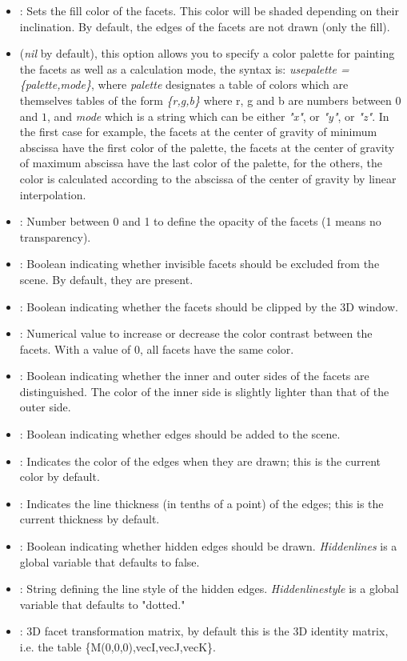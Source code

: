 \begin{itemize}
    \item {}: Sets the fill color of the facets. This color will be shaded depending on their inclination. By default, the edges of the facets are not drawn (only the fill).     \item {} (\emph{nil} by default), this option allows you to specify a color palette for painting the facets as well as a calculation mode, the syntax is: \emph{usepalette = \{palette,mode\}}, where \emph{palette} designates a table of colors which are themselves tables of the form \emph{\{r,g,b\}} where r, g and b are numbers between $0$ and $1$, and \emph{mode} which is a string which can be either \emph{"x"}, or \emph{"y"}, or \emph{"z"}. In the first case for example, the facets at the center of gravity of minimum abscissa have the first color of the palette, the facets at the center of gravity of maximum abscissa have the last color of the palette, for the others, the color is calculated according to the abscissa of the center of gravity by linear interpolation.     \item {}: Number between 0 and 1 to define the opacity of the facets (1 means no transparency).
    \item {}: Boolean indicating whether invisible facets should be excluded from the scene. By default, they are present.
    \item {}: Boolean indicating whether the facets should be clipped by the 3D window.
    \item {}: Numerical value to increase or decrease the color contrast between the facets. With a value of 0, all facets have the same color.
    \item {}: Boolean indicating whether the inner and outer sides of the facets are distinguished. The color of the inner side is slightly lighter than that of the outer side.

    \item {}: Boolean indicating whether edges should be added to the scene.
    \item {}: Indicates the color of the edges when they are drawn; this is the current color by default.
    \item {}: Indicates the line thickness (in tenths of a point) of the edges; this is the current thickness by default.
    \item {}: Boolean indicating whether hidden edges should be drawn. \emph{Hiddenlines} is a global variable that defaults to false.
    \item {}: String defining the line style of the hidden edges. \emph{Hiddenlinestyle} is a global variable that defaults to "dotted."     \item {}: 3D facet transformation matrix, by default this is the 3D identity matrix, i.e. the table \{M(0,0,0),vecI,vecJ,vecK\}.
\end{itemize}


